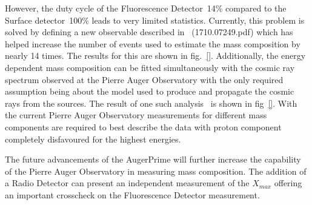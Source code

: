 However, the duty cycle of the Fluorescence Detector~14\% compared to the Surface detector~100\% leads to very limited statistics. Currently, this problem is solved by defining a new observable described in ~\cite{}(1710.07249.pdf) which has helped increase the number of events used to estimate the mass composition by nearly 14 times. The results for this are shown in fig.~\ref{}. Additionally, the energy dependent mass composition can be fitted simultaneously with the cosmic ray spectrum observed at the Pierre Auger Observatory with the only required assumption being about the model used to produce and propagate the cosmic rays from the sources. The result of one such analysis~\cite{} is shown in fig~\ref{}. With the current Pierre Auger Observatory measurements for different mass components are required to best describe the data with proton component completely disfavoured for the highest energies.   

The future advancements of the AugerPrime will further increase the capability of the Pierre Auger Observatory in measuring mass composition. The addition of a Radio Detector can present an independent measurement of the $X_{max}$ offering an important crosscheck on the Fluorescence Detector measurement. 

